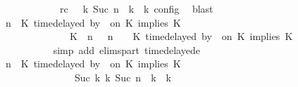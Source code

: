 \begin{isabellebody}
\ \ \ \ \ \ \ \ \ \ \ \ \ rc{\isacharcolon}{\isacartoucheopen}{\isasymrho}\ {\isasymin}\ {\isasymlbrakk}\ {\isasymGamma}\isactrlsub k{\isacharcomma}\ Suc\ n\ {\isasymturnstile}\ {\isasymPsi}\isactrlsub k\ {\isasymtriangleright}\ {\isasymPhi}\isactrlsub k\ {\isasymrbrakk}\isactrlsub c\isactrlsub o\isactrlsub n\isactrlsub f\isactrlsub i\isactrlsub g{\isacartoucheclose}\ \isamarkupfalse%
\ blast\isanewline
\ \ \ \ \ \ \ \ \isamarkupfalse%
\ {\isacartoucheopen}{\isacharparenleft}{\isasymGamma}{\isacharcomma}\ n\ {\isasymturnstile}\ {\isacharparenleft}{\isacharparenleft}K\ time{\isacharminus}delayed\ by\ {\isasymdelta}{\isasymtau}\ on\ K\ implies\ K\ {\isacharhash}\ {\isasymPsi}{\isacharparenright}\ {\isasymtriangleright}\ {\isasymPhi}{\isacharparenright}\isanewline
\ \ \ \ \ \ \ \ \ \ \ \ \ \ {\isasymhookrightarrow}\ {\isacharparenleft}{\isacharparenleft}{\isacharparenleft}K\ {\isasymnot}{\isasymUp}\ n{\isacharparenright}\ {\isacharhash}\ {\isasymGamma}{\isacharparenright}{\isacharcomma}\ n\ {\isasymturnstile}\ {\isasymPsi}\ {\isasymtriangleright}\ {\isacharparenleft}{\isacharparenleft}K\ time{\isacharminus}delayed\ by\ {\isasymdelta}{\isasymtau}\ on\ K\ implies\ K\ {\isacharhash}\ {\isasymPhi}{\isacharparenright}{\isacharparenright}{\isacartoucheclose}\isanewline
\ \ \ \ \ \ \ \ \ \ \isamarkupfalse%
\ {\isacharparenleft}simp\ add{\isacharcolon}\ elims{\isacharunderscore}part\ timedelayed{\isacharunderscore}e{}{\isacharparenright}\isanewline
\ \ \ \ \ \ \ \ \isamarkupfalse%
\ {\isacartoucheopen}{\isacharparenleft}{\isasymGamma}{\isacharcomma}\ n\ {\isasymturnstile}\ {\isacharparenleft}{\isacharparenleft}K\ time{\isacharminus}delayed\ by\ {\isasymdelta}{\isasymtau}\ on\ K\ implies\ K\ {\isacharhash}\ {\isasymPsi}{\isacharparenright}\ {\isasymtriangleright}\ {\isasymPhi}{\isacharparenright}\isanewline
\ \ \ \ \ \ \ \ \ \ \ \ \ \ \ \ {\isasymhookrightarrow}\isactrlbsup Suc\ k\isactrlesup \ {\isacharparenleft}{\isasymGamma}\isactrlsub k{\isacharcomma}\ Suc\ n\ {\isasymturnstile}\ {\isasymPsi}\isactrlsub k\ {\isasymtriangleright}\ {\isasymPhi}\isactrlsub k{\isacharparenright}{\isacartoucheclose}\isanewline
\ \ \ \ \ \ \ \ \ \ \isamarkupfalse%

\end{isabellebody}
